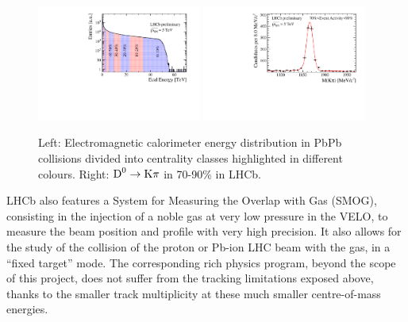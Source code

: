 \documentclass[a4paper,11pt]{article}
\begin{document}

\begin{figure}[htb]
  \begin{center}
    \includegraphics[width=0.48\textwidth]{plots/ecal_in_ecal_bins.pdf}
    \includegraphics[width=0.48\textwidth]{plots/d0_ecalbin_90_70.pdf}
  \end{center}
  \caption{Left: Electromagnetic calorimeter energy distribution in 
PbPb collisions divided into centrality classes highlighted in different colours.
  Right: $\text{D}^0 \to \text{K}\pi$ in 70-90\% \pbpb in LHCb. 
  \label{fig:pbpblhcb}}
\end{figure}

LHCb also features a System for Measuring the Overlap with Gas (SMOG), consisting in the injection of a noble gas at very low pressure in the VELO, to measure the beam
position and profile with very high precision. It also allows for the study of the collision of the proton or Pb-ion LHC beam with the gas, in a ``fixed target'' mode.
The corresponding rich physics program, beyond the scope of this project, does not suffer from the tracking limitations exposed above, thanks to the smaller track multiplicity
at these much smaller centre-of-mass energies.
\end{document}
